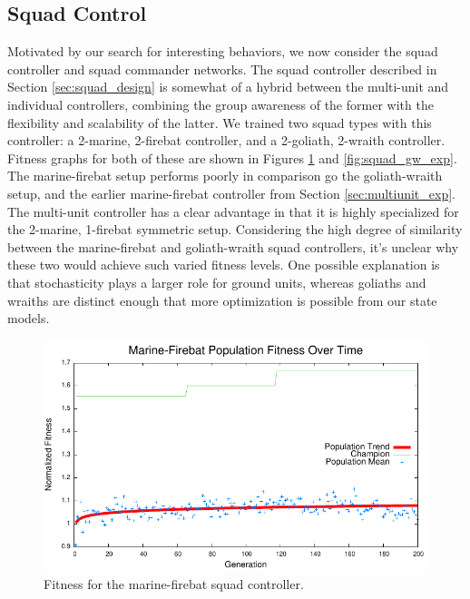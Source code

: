\documentclass[10pt,a4paper,twocolumn]{article}
\begin{document}
\subsection{Squad Control}
\label{sec:squad_exp}

Motivated by our search for interesting behaviors, we now consider the squad controller and squad commander networks. The squad controller described in Section \ref{sec:squad_design} is somewhat of a hybrid between the multi-unit and individual controllers, combining the group awareness of the former with the flexibility and scalability of the latter. We trained two squad types with this controller: a 2-marine, 2-firebat controller, and a 2-goliath, 2-wraith controller. Fitness graphs for both of these are shown in Figures \ref{fig:squad_mf_exp} and \ref{fig:squad_gw_exp}. The marine-firebat setup performs poorly in comparison go the goliath-wraith setup, and the earlier marine-firebat controller from Section \ref{sec:multiunit_exp}. The multi-unit controller has a clear advantage in that it is highly specialized for the 2-marine, 1-firebat symmetric setup. Considering the high degree of similarity between the marine-firebat and goliath-wraith squad controllers, it's unclear why these two would achieve such varied fitness levels. One possible explanation is that stochasticity plays a larger role for ground units, whereas goliaths and wraiths are distinct enough that more optimization is possible from our state models.

\begin{figure}
\centering
\includegraphics[scale=.59]{plots/squad_mf.pdf}
\caption{Fitness for the marine-firebat squad controller.}
\label{fig:squad_mf_exp}
\end{figure}
\end{document}
